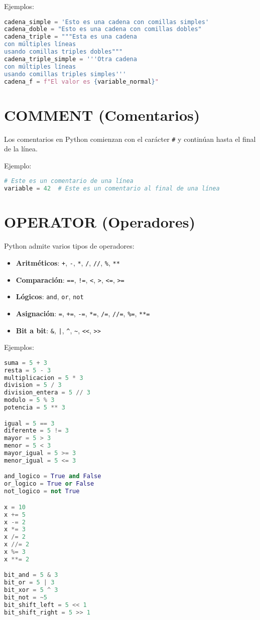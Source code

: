 \documentclass[12pt,letterpaper]{report}
\begin{document}
Ejemplos:
\begin{lstlisting}[language=Python]
cadena_simple = 'Esto es una cadena con comillas simples'
cadena_doble = "Esto es una cadena con comillas dobles"
cadena_triple = """Esta es una cadena
con múltiples líneas
usando comillas triples dobles"""
cadena_triple_simple = '''Otra cadena
con múltiples líneas
usando comillas triples simples'''
cadena_f = f"El valor es {variable_normal}"
\end{lstlisting}

\section{COMMENT (Comentarios)}

Los comentarios en Python comienzan con el carácter \texttt{\#} y continúan hasta el final de la línea.

Ejemplo:
\begin{lstlisting}[language=Python]
# Este es un comentario de una línea
variable = 42  # Este es un comentario al final de una línea
\end{lstlisting}

\section{OPERATOR (Operadores)}

Python admite varios tipos de operadores:

\begin{itemize}
    \item \textbf{Aritméticos}: \texttt{+}, \texttt{-}, \texttt{*}, \texttt{/}, \texttt{//}, \texttt{\%}, \texttt{**}
    \item \textbf{Comparación}: \texttt{==}, \texttt{!=}, \texttt{<}, \texttt{>}, \texttt{<=}, \texttt{>=}
    \item \textbf{Lógicos}: \texttt{and}, \texttt{or}, \texttt{not}
    \item \textbf{Asignación}: \texttt{=}, \texttt{+=}, \texttt{-=}, \texttt{*=}, \texttt{/=}, \texttt{//=}, \texttt{\%=}, \texttt{**=}
    \item \textbf{Bit a bit}: \texttt{\&}, \texttt{|}, \texttt{\^}, \texttt{\~}, \texttt{<<}, \texttt{>>}
\end{itemize}

Ejemplos:
\begin{lstlisting}[language=Python]
suma = 5 + 3
resta = 5 - 3
multiplicacion = 5 * 3
division = 5 / 3
division_entera = 5 // 3
modulo = 5 % 3
potencia = 5 ** 3

igual = 5 == 3
diferente = 5 != 3
mayor = 5 > 3
menor = 5 < 3
mayor_igual = 5 >= 3
menor_igual = 5 <= 3

and_logico = True and False
or_logico = True or False
not_logico = not True

x = 10
x += 5
x -= 2
x *= 3
x /= 2
x //= 2
x %= 3
x **= 2

bit_and = 5 & 3
bit_or = 5 | 3
bit_xor = 5 ^ 3
bit_not = ~5
bit_shift_left = 5 << 1
bit_shift_right = 5 >> 1
\end{lstlisting}
\end{document}

